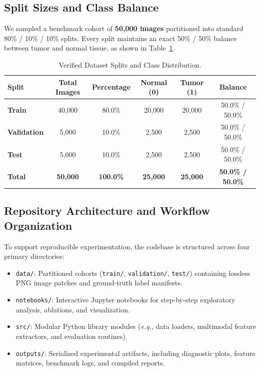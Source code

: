\documentclass[11pt,a4paper]{article}
\begin{document}
\subsection{Split Sizes and Class Balance}
We sampled a benchmark cohort of \textbf{50,000 images} partitioned into standard 80\% / 10\% / 10\% splits. Every split maintains an exact 50\% / 50\% balance between tumor and normal tissue, as shown in Table~\ref{tab:splits}.

\begin{table}[H]
\centering
\small
\caption{Verified Dataset Splits and Class Distribution.}
\label{tab:splits}
\begin{tabular}{lccccc}
\toprule
\textbf{Split} & \textbf{Total Images} & \textbf{Percentage} & \textbf{Normal (0)} & \textbf{Tumor (1)} & \textbf{Balance} \\
\midrule
\textbf{Train}      & 40,000 & 80.0\% & 20,000 & 20,000 & 50.0\% / 50.0\% \\
\textbf{Validation} & 5,000  & 10.0\% & 2,500  & 2,500  & 50.0\% / 50.0\% \\
\textbf{Test}       & 5,000  & 10.0\% & 2,500  & 2,500  & 50.0\% / 50.0\% \\
\midrule
\textbf{Total}      & \textbf{50,000} & \textbf{100.0\%} & \textbf{25,000} & \textbf{25,000} & \textbf{50.0\% / 50.0\%} \\
\bottomrule
\end{tabular}
\end{table}

\subsection{Repository Architecture and Workflow Organization}
To support reproducible experimentation, the codebase is structured across four primary directories:
\begin{itemize}[noitemsep]
    \item \texttt{data/}: Partitioned cohorts (\texttt{train/}, \texttt{validation/}, \texttt{test/}) containing lossless PNG image patches and ground-truth label manifests.
    \item \texttt{notebooks/}: Interactive Jupyter notebooks for step-by-step exploratory analysis, ablations, and visualization.
    \item \texttt{src/}: Modular Python library modules (\textit{e.g.}, data loaders, multimodal feature extractors, and evaluation routines).
    \item \texttt{outputs/}: Serialized experimental artifacts, including diagnostic plots, feature matrices, benchmark logs, and compiled reports.
\end{itemize}
\end{document}
